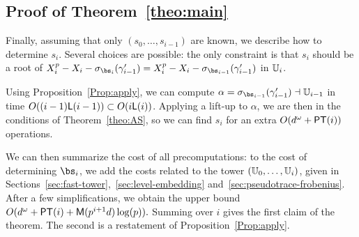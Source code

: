 
\subsection{Proof of Theorem~\ref{theo:main}}

\noindent Finally, assuming that only $(s_0,\dots,s_{i-1})$ are known,
we describe how to determine $s_i$. Several choices are possible: the
only constraint is that $s_i$ should be a root of
$X_i^p-X_i-\sigma_{\bs_i}(\gamma'_{i-1})=X_i^p-X_i-\sigma_{\bs_{i-1}}(\gamma'_{i-1})$ in $\mathbb{U}_i$. 

Using Proposition~\ref{Prop:apply}, we can compute
$\alpha=\sigma_{\bs_{i-1}}(\gamma'_{i-1}) \wrt\U_{i-1}$ in time
$O((i-1)\mathsf{L}(i-1)) \subset O(i\mathsf{L}(i))$.  Applying a lift-up to $\alpha$,
we are then in the conditions of Theorem~\ref{theo:AS}, so we can find
$s_i$ for an extra $O(d^\omega + \mathrm{\sf PT}(i))$ operations.

We can then summarize the cost of all precomputations: to the cost of
determining $\bs_i$, we add the costs related to the tower
$(\mathbb{U}_0,\dots,\mathbb{U}_i)$, given in
Sections~\ref{sec:fast-tower},~\ref{sec:level-embedding}
and~\ref{sec:pseudotrace-frobenius}. After a few simplifications, we
obtain the upper bound $O( d^\omega + \mathrm{\sf PT}(i) + \mathrm{\sf M}(p^{i+1} d)
\log(p)).$ Summing over $i$ gives the first claim of the theorem. The
second is a restatement of Proposition~\ref{Prop:apply}.


%
